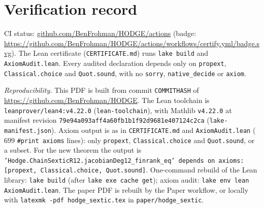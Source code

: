 \documentclass[11pt]{amsart}
\theoremstyle{remark}\newtheorem{remark}[theorem]{Remark}
\begin{document}
\appendix
\section{Verification record}
CI status: \href{https://github.com/BenFrohman/HODGE/actions}{github.com/BenFrohman/HODGE/actions}
(badge: \url{https://github.com/BenFrohman/HODGE/actions/workflows/certify.yml/badge.svg}).
The Lean certificate (\texttt{CERTIFICATE.md}) runs \texttt{lake build} and \texttt{AxiomAudit.lean}.
Every audited declaration depends only on \texttt{propext}, \texttt{Classical.choice} and
\texttt{Quot.sound}, with no \texttt{sorry}, \texttt{native\_decide} or \texttt{axiom}.

\emph{Reproducibility.} This PDF is built from commit \texttt{COMMITHASH} of
\url{https://github.com/BenFrohman/HODGE}. The Lean toolchain is
\texttt{leanprover/lean4:v4.22.0} (\texttt{lean-toolchain}), with Mathlib
\texttt{v4.22.0} at manifest revision
\texttt{79e94a093aff4a60fb1b1f92d9681e407124c2ca} (\texttt{lake-manifest.json}).
Axiom output is as in \texttt{CERTIFICATE.md} and \texttt{AxiomAudit.lean}
($699$ \texttt{\#print axioms} lines): only \texttt{propext}, \texttt{Classical.choice}
and \texttt{Quot.sound}, or a subset. For the new theorem the output is
\texttt{'Hodge.ChainSexticR12.jacobianDeg12\_finrank\_eq' depends on axioms:
[propext, Classical.choice, Quot.sound]}. One-command rebuild of the Lean library:
\texttt{lake build} (after \texttt{lake exe cache get}); axiom audit:
\texttt{lake env lean AxiomAudit.lean}.
The paper PDF is rebuilt by the Paper workflow, or locally with
\texttt{latexmk -pdf hodge\_sextic.tex} in \texttt{paper/hodge\_sextic}.
\medskip
\end{document}
